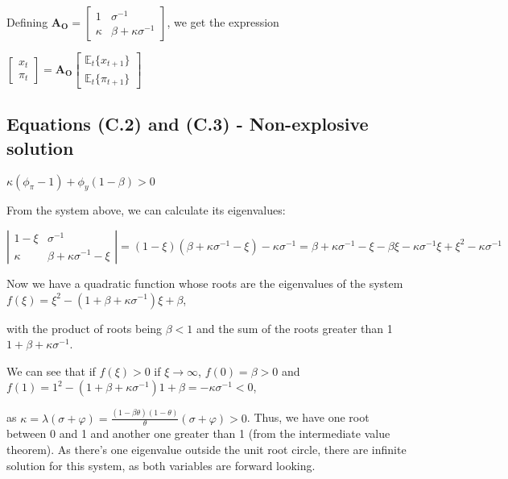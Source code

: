 \documentclass[
]{article}
\begin{document}
Defining
\(\mathbf{A_O}=\left[ \begin{matrix} 1 & \sigma^{-1} \\ \kappa & \beta +\kappa \sigma^{-1} \end{matrix} \right]\),
we get the expression

\(\displaystyle \left[ \begin{matrix} x_t\\ \pi_t \end{matrix} \right] =\mathbf{A_O} \left[ \begin{matrix} \mathbb{E}_t\{x_{t+1} \}\\ \mathbb{E}_t \{\pi_{t+1} \} \end{matrix} \right]\)

\vspace{12pt}

\hypertarget{equations-c.2-and-c.3---non-explosive-solution}{%
\subsection{Equations (C.2) and (C.3) - Non-explosive
solution}\label{equations-c.2-and-c.3---non-explosive-solution}}

\(\kappa (\phi_\pi-1)+\phi_y(1-\beta)>0\)

\vspace{8pt}

From the system above, we can calculate its eigenvalues:

\(\left| \begin{matrix} 1-\xi & \sigma^{-1} \\ \kappa & \beta +\kappa \sigma^{-1}-\xi \end{matrix} \right|=(1-\xi)(\beta +\kappa \sigma^{-1}-\xi)-\kappa \sigma^{-1}= \beta +\kappa \sigma^{-1}-\xi - \beta \xi -\kappa \sigma^{-1} \xi+\xi^2 -\kappa \sigma^{-1}\)

Now we have a quadratic function whose roots are the eigenvalues of the
system \(f(\xi)=\xi^2-(1+\beta+\kappa \sigma^{-1})\xi+\beta\),

with the product of roots being \(\beta<1\) and the sum of the roots
greater than 1 \(1+\beta+\kappa \sigma^{-1}\).

We can see that if \(f(\xi)>0\) if \(\xi \rightarrow \infty\),
\(f(0)=\beta>0\) and
\(f(1)=1^2-(1+\beta+\kappa \sigma^{-1})1+\beta=-\kappa \sigma^{-1}<0\),

as
\(\displaystyle \kappa=\lambda(\sigma+\varphi)=\frac{(1-\beta \theta)(1-\theta)}{\theta}(\sigma+\varphi)>0\).
Thus, we have one root between 0 and 1 and another one greater than 1
(from the intermediate value theorem). As there's one eigenvalue outside
the unit root circle, there are infinite solution for this system, as
both variables are forward looking.
\end{document}
